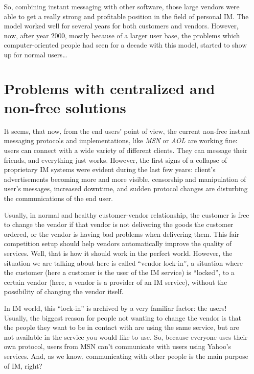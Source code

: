 So, combining instant messaging with other software, those large vendors were
able to get a really strong and prof\hbox{}itable position in the f\hbox{}ield
of personal IM.  The model worked well for several years for both customers and
vendors. However, now, after year 2000, mostly because of a larger user base,
the problems which computer-oriented people had seen for a decade with this
model, started to show up for normal users\ldots


\section{Problems with centralized and non-free solutions}
\label{s:jim_client_server:problems_centralized}

It seems, that now, from the end users' point of view, the current non-free
instant messaging protocols and implementations, like \textit{MSN} or
\textit{AOL} are working f\hbox{}ine: users can connect with a wide variety of
dif\hbox{}ferent clients. They can message their friends, and everything just
works.  However, the f\hbox{}irst signs of a collapse of proprietary IM systems
were evident during the last few years: client's advertisements becoming more
and more visible, censorship and manipulation of user's messages, increased
downtime, and sudden protocol changes are disturbing the communications of the
end user.

Usually, in normal and healthy customer-vendor relationship, the customer is
free to change the vendor if that vendor is not delivering the goods the
customer ordered, or the vendor is having bad problems when delivering them.
This fair competition setup should help vendors automatically improve the
quality of services. Well, that is how it should work in the perfect world.
However,  the situation we are talking about here is called ``vendor lock-in'',
a situation where the customer (here a customer is the user of the IM service)
is ``locked'', to a certain vendor (here, a vendor is a provider of an IM
service), without the possibility of changing the vendor itself.

In IM world, this ``lock-in'' is archived by a very familiar factor: the users!
Usually, the biggest reason for people  not wanting to change the vendor is that
the people they want to be in contact with are using the same service, but are
not available in the service you would like to use. So, because everyone uses
their own protocol, users from MSN can't communicate with users using Yahoo's
services. And, as we know, communicating with other people is the main purpose
of IM, right?

